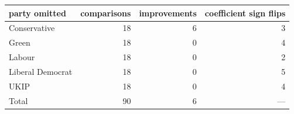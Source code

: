 \begin{tabular}{lrrr}
\toprule
party omitted & comparisons & improvements & coefficient sign flips \\
\midrule
Conservative     & 18 & 6 & 3 \\
Green            & 18 & 0 & 4 \\
Labour           & 18 & 0 & 2 \\
Liberal Democrat & 18 & 0 & 5 \\
UKIP             & 18 & 0 & 4 \\
\midrule
Total            & 90 & 6 & --- \\
\bottomrule
\end{tabular}
